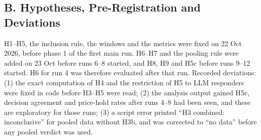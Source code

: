 \documentclass[11pt]{article}
\begin{document}
\hypertarget{b.-hypotheses-pre-registration-and-deviations}{%
\subsection*{B. Hypotheses, Pre-Registration and Deviations}\label{b.-hypotheses-pre-registration-and-deviations}}

H1--H5, the inclusion rule, the windows and the metrics were fixed on 22 Oct 2026, before phase 1 of the first main run. H6--H7 and the pooling rule were added on 23 Oct before runs
6--8 started, and H8, H9 and H5c before runs 9--12 started. H6 for run 4 was therefore evaluated
after that run. Recorded deviations: (1) the exact computation of H4 and the restriction of H5 to
LLM responders were fixed in code before H3--H5 were read; (2) the analysis output gained H5c,
decision agreement and price-hold rates after runs 4--8 had been seen, and these are exploratory for
those runs; (3) a script error printed ``H3 combined: inconclusive'' for pooled data without H3b, and
was corrected to ``no data'' before any pooled verdict was used.
\end{document}
